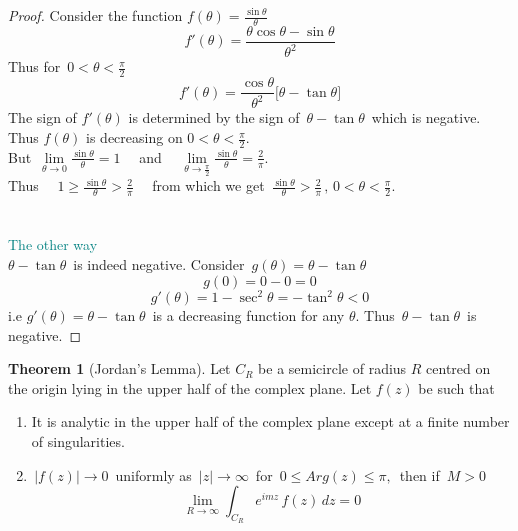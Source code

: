 \documentclass[11pt,a4paper]{article}
\theoremstyle{definition}
\newtheorem{thm}{Theorem}[section]
\begin{document}
\begin{proof}
Consider the function $f(\theta) = \frac{\sin \theta}{\theta}$ $$f'(\theta) = \frac{\theta \cos \theta - \sin \theta}{\theta^2}$$
Thus for $\, 0 < \theta  < \frac{\pi}{2}$
$$f'(\theta) = \frac{\cos \theta}{\theta^2}\big[\theta - \tan \theta\big]$$
The sign of $f'(\theta)$ is determined by the sign of $\,\theta - \tan \theta \,$ which is negative. Thus $f(\theta)$ is decreasing on $0 < \theta < \frac{\pi}{2}$.\\
But $\, \lim\limits_{\theta \rightarrow 0} \frac{\sin \theta}{\theta} = 1 \quad $ and $\quad  \lim\limits_{\theta \rightarrow \frac{\pi}{2}} \frac{\sin \theta}{\theta} = \frac{2}{\pi}$.\\
Thus $\quad  1\geq \frac{\sin\theta}{\theta}> \frac{2}{\pi}\quad $ from which we get $\, \frac{\sin\theta}{\theta} > \frac{2}{\pi}\,,\, 0 < \theta < \frac{\pi}{2}$.\\\\\\



\textcolor{teal}{The other way}\\
$\theta - \tan \theta\,$ is indeed negative. Consider $\, g(\theta) = \theta - \tan \theta$ $$g(0) = 0- 0 = 0$$
$$g'(\theta) = 1 - \sec^2\theta = - \tan^2\theta < 0$$ i.e $g'(\theta) = \theta - \tan \theta\,$ is a decreasing function for any $\theta$. Thus $\, \theta - \tan \theta \,$ is negative.
\end{proof}

\begin{thm}[Jordan's Lemma]
Let $C_R$ be a semicircle of radius $R$ centred on the origin lying in the upper half of the complex plane. Let $f(z)$ be such that 
\begin{enumerate}
\item[i.] It is analytic in the upper half of the complex plane except at a finite number of singularities.
\item[ii.] $\,\left|f(z)\right|\longrightarrow 0\,$ uniformly as $\, \left|z\right| \longrightarrow \infty\,$ for $\, 0\leq Arg(z) \leq \pi,\,$ then if $\, M>0$
$$\lim\limits_{R\rightarrow \infty} \int_{C_R} e^{imz}\,f(z)\,dz = 0$$\\
\end{enumerate}
\end{thm}
\end{document}
